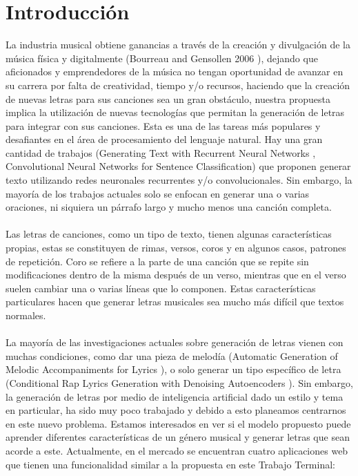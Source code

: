 \documentclass[12pt, a4paper, titlepage]{report}
\begin{document}
    \renewcommand\thechapter{\arabic{chapter}}
    \renewcommand{\appendixname}{Capítulo}
    \renewcommand{\lstlistingname}{C\'odigo}
    \renewcommand{\thepart}{}
    \renewcommand{\partname}{}
    \chapter{\textcolor{azulescom}{Introducción}}
    La industria musical obtiene ganancias a través de la creación y divulgación de la música física y digitalmente (Bourreau and Gensollen 2006 \cite{Bourreau_and_Gensollen}), dejando que aficionados y emprendedores de la música no tengan oportunidad de avanzar en su carrera por falta de creatividad, tiempo y/o recursos, haciendo que la creación de nuevas letras para sus canciones sea un gran obstáculo, nuestra propuesta implica la utilización de nuevas tecnologías que permitan la generación de letras para integrar con sus canciones. Esta es una de las tareas más populares y desafiantes en el área de procesamiento del lenguaje natural. Hay una gran cantidad de trabajos (Generating Text with Recurrent Neural Networks \cite{Generating_Text_with_RNN}, Convolutional Neural Networks for Sentence Classification\cite{CNN_for_Sentence_Classification}) que proponen generar texto utilizando redes neuronales recurrentes y/o convolucionales. Sin embargo, la mayoría de los trabajos actuales solo se enfocan en generar una o varias oraciones, ni siquiera un párrafo largo y mucho menos una canción completa.\\\\
    Las letras de canciones, como un tipo de texto, tienen algunas características propias, estas se constituyen de rimas, versos, coros y en algunos casos, patrones de repetición. Coro se refiere a la parte de una canción que se repite sin modificaciones dentro de la misma después de un verso, mientras que en el verso suelen cambiar una o varias líneas que lo componen. Estas características particulares hacen que generar letras musicales sea mucho más difícil que textos normales.\\\\
    La mayoría de las investigaciones actuales sobre generación de letras vienen con muchas condiciones, como dar una pieza de melodía (Automatic Generation of Melodic Accompaniments for Lyrics \cite{Automatic_Generation_of_Melodic_Accompaniments_for_Lyrics}), o solo generar un tipo específico de letra (Conditional Rap Lyrics Generation with Denoising Autoencoders \cite{Conditional_Rap_Lyrics_Generation}). Sin embargo, la generación de letras por medio de inteligencia artificial dado un estilo y tema en particular, ha sido muy poco trabajado y debido a esto planeamos centrarnos en este nuevo problema. Estamos interesados en ver si el modelo propuesto puede aprender diferentes características de un género musical y generar letras que sean acorde a este. Actualmente, en el mercado se encuentran cuatro aplicaciones web que tienen una funcionalidad similar a la propuesta en este Trabajo Terminal:\par
    
\end{document}
